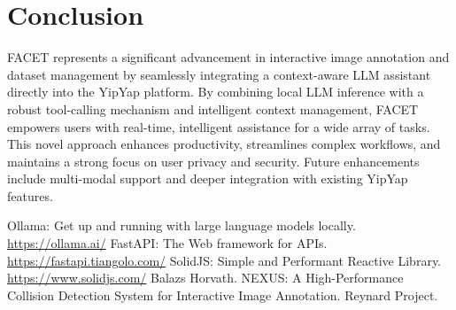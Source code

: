 \documentclass[10pt]{article}
\begin{document}
\section{Conclusion}
FACET represents a significant advancement in interactive image annotation and dataset management by seamlessly integrating a context-aware LLM assistant directly into the YipYap platform. By combining local LLM inference with a robust tool-calling mechanism and intelligent context management, FACET empowers users with real-time, intelligent assistance for a wide array of tasks. This novel approach enhances productivity, streamlines complex workflows, and maintains a strong focus on user privacy and security. Future enhancements include multi-modal support and deeper integration with existing YipYap features.


\begin{thebibliography}{99}
 Ollama: Get up and running with large language models locally. \url{https://ollama.ai/}
 FastAPI: The Web framework for APIs. \url{https://fastapi.tiangolo.com/}
 SolidJS: Simple and Performant Reactive Library. \url{https://www.solidjs.com/}
 Balazs Horvath. NEXUS: A High-Performance Collision Detection System for Interactive Image Annotation. Reynard Project.
\end{thebibliography}
\end{document}
